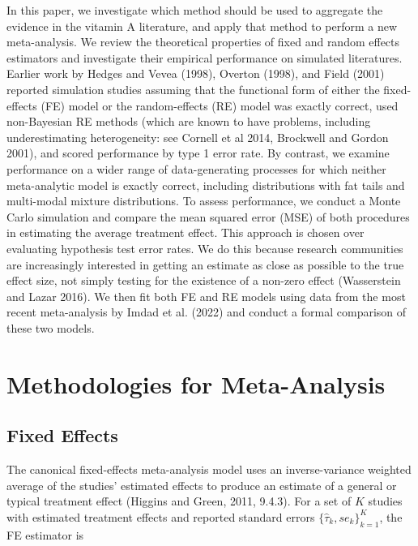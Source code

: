 \documentclass[12pt]{article}
\begin{document}
In this paper, we investigate which method should be used to aggregate the evidence in the vitamin A literature, and apply that method to perform a new meta-analysis. We review the theoretical properties of fixed and random effects estimators and investigate their empirical performance on simulated literatures. 
Earlier work by Hedges and Vevea (1998), Overton (1998), and Field (2001) reported simulation studies assuming that the functional form of either the fixed-effects (FE) model or the random-effects (RE) model was exactly correct, used non-Bayesian RE methods (which are known to have problems, including underestimating heterogeneity: see Cornell et al 2014, Brockwell and Gordon 2001), and scored performance by type 1 error rate. By contrast, we examine performance on a wider range of data-generating processes for which neither meta-analytic model is exactly correct, including distributions with fat tails and multi-modal mixture distributions. To assess performance, we conduct a Monte Carlo simulation and compare the mean squared error (MSE) of both procedures in estimating the average treatment effect. This approach is chosen over evaluating hypothesis test error rates. We do this because research communities are increasingly interested in getting an estimate as close as possible to the true effect size, not simply testing for the existence of a non-zero effect (Wasserstein and Lazar 2016). We then fit both FE and RE models using data from the most recent meta-analysis by Imdad et al. (2022) and conduct a formal comparison of these two models.



\section{Methodologies for Meta-Analysis}

\subsection{Fixed Effects}

The canonical fixed-effects meta-analysis model uses an inverse-variance weighted average of the studies' estimated effects to produce an estimate of a general or typical treatment effect (Higgins and Green, 2011, 9.4.3). For a set of $K$ studies with estimated treatment effects and reported standard errors  $\{\hat{\tau}_k, se_k\}_{k=1}^K$, the FE estimator is
\end{document}
